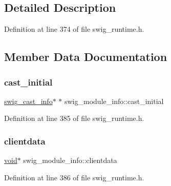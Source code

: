 \subsection{Detailed Description}


Definition at line 374 of file swig\+\_\+runtime.\+h.



\subsection{Member Data Documentation}
\mbox{\label{structswig__module__info_a281dac542d1af6af141b8366ecc4de92}} 
\subsubsection{\texorpdfstring{cast\+\_\+initial}{cast\_initial}}
{\footnotesize\ttfamily \mbox{\hyperlink{structswig__cast__info}{swig\+\_\+cast\+\_\+info}}$\ast$ $\ast$ swig\+\_\+module\+\_\+info\+::cast\+\_\+initial}



Definition at line 385 of file swig\+\_\+runtime.\+h.

\mbox{\label{structswig__module__info_a9fb6e461fcaf14c209049adfae4e9754}} 
\subsubsection{\texorpdfstring{clientdata}{clientdata}}
{\footnotesize\ttfamily \mbox{\hyperlink{_thread_8h_af1e856da2e658414cb2456cb6f7ebc66}{void}}$\ast$ swig\+\_\+module\+\_\+info\+::clientdata}



Definition at line 386 of file swig\+\_\+runtime.\+h.

\mbox{\label{structswig__module__info_ac177d150b85ab77122089acf1f06d9c6}} 
